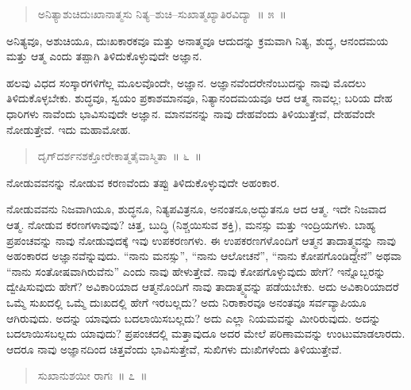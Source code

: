 \vspace{-0.3cm}

\begin{verse}
ಅನಿತ್ಯಾಶುಚಿದುಃಖಾನಾತ್ಮಸು ನಿತ್ಯ–ಶುಚಿ–ಸುಖಾತ್ಮಖ್ಯಾತಿರವಿದ್ಯಾ~॥ ೫~॥
\end{verse}

\vspace{-0.3cm}

ಅನಿತ್ಯವೂ, ಅಶುಚಿಯೂ, ದುಃಖಕಾರಕವೂ ಮತ್ತು ಅನಾತ್ಮವೂ ಆದುದನ್ನು ಕ್ರಮವಾಗಿ ನಿತ್ಯ, ಶುದ್ಧ, ಆನಂದಮಯ ಮತ್ತು ಆತ್ಮ ಎಂದು ತಪ್ಪಾಗಿ ತಿಳಿದುಕೊಳ್ಳುವುದೇ ಅಜ್ಞಾನ. 

ಹಲವು ವಿಧದ ಸಂಸ್ಕಾರಗಳಿಗೆಲ್ಲ ಮೂಲವೊಂದೇ, ಅಜ್ಞಾನ. ಅಜ್ಞಾನವೆಂದರೇನೆಂಬು\break ದನ್ನು ನಾವು ಮೊದಲು ತಿಳಿದುಕೊಳ್ಳಬೇಕು. ಶುದ್ಧವೂ, ಸ್ವಯಂ ಪ್ರಕಾಶಮಾನವೂ, ನಿತ್ಯಾನಂದಮಯವೂ ಆದ ಆತ್ಮ ನಾವಲ್ಲ; ಬರಿಯ ದೇಹ ಧಾರಿಗಳು ನಾವೆಂದು ಭಾವಿಸುವುದೇ ಅಜ್ಞಾನ. ಮಾನವನನ್ನು ನಾವು ದೇಹವೆಂದು ತಿಳಿಯುತ್ತೇವೆ, ದೇಹವೆಂದೇ ನೋಡುತ್ತೇವೆ. ಇದು ಮಹಾಮೋಹ. 

\vspace{-0.3cm}

\begin{verse}
ದೃಗ್​ದರ್ಶನಶಕ್ತೋರೇಕಾತ್ಮತೈವಾಸ್ಮಿತಾ~॥ ೬~॥
\end{verse}

\vspace{-0.3cm}

ನೋಡುವವನನ್ನು ನೋಡುವ ಕರಣವೆಂದು ತಪ್ಪು ತಿಳಿದುಕೊಳ್ಳುವುದೇ ಅಹಂಕಾರ. 

ನೋಡುವವನು ನಿಜವಾಗಿಯೂ, ಶುದ್ಧನೂ, ನಿತ್ಯಪವಿತ್ರನೂ, ಅನಂತನೂ,\break ಅದ್ಭುತನೂ ಆದ ಆತ್ಮ. ಇದೇ ನಿಜವಾದ ಆತ್ಮ. ನೋಡುವ ಕರಣಗಳಾವುವು? ಚಿತ್ತ, ಬುದ್ಧಿ (ನಿಶ್ಚಯಿಸುವ ಶಕ್ತಿ), ಮನಸ್ಸು ಮತ್ತು ಇಂದ್ರಿಯಗಳು. ಬಾಹ್ಯ ಪ್ರಪಂಚವನ್ನು ನಾವು ನೋಡುವುದಕ್ಕೆ ಇವು ಉಪಕರಣಗಳು. ಈ ಉಪಕರಣಗಳೊಂದಿಗೆ ಆತ್ಮನ ತಾದಾತ್ಮ್ಯವನ್ನು ನಾವು ಅಹಂಕಾರದ ಅಜ್ಞಾನವೆನ್ನುವುದು. “ನಾನು ಮನಸ್ಸು”, “ನಾನು ಆಲೋಚನೆ”, “ನಾನು ಕೋಪಗೊಂಡಿದ್ದೇನೆ” ಅಥವಾ “ನಾನು ಸಂತೋಷವಾಗಿರುವೆನು” ಎಂದು ನಾವು ಹೇಳುತ್ತೇವೆ. ನಾವು ಕೋಪಗೊಳ್ಳುವುದು ಹೇಗೆ? ಇನ್ನೊಬ್ಬರನ್ನು ದ್ವೇಷಿಸುವುದು ಹೇಗೆ? ಅವಿಕಾರಿಯಾದ ಆತ್ಮನೊಂದಿಗೆ ನಾವು ತಾದಾತ್ಮ್ಯವನ್ನು ಪಡೆಯಬೇಕು. ಅದು ಅವಿಕಾರಿಯಾದರೆ ಒಮ್ಮೆ ಸುಖದಲ್ಲಿ ಒಮ್ಮೆ ದುಃಖದಲ್ಲಿ ಹೇಗೆ ಇರಬಲ್ಲದು? ಅದು ನಿರಾಕಾರವೂ ಅನಂತವೂ ಸರ್ವವ್ಯಾಪಿಯೂ ಆಗಿರುವುದು. ಅದನ್ನು ಯಾವುದು ಬದಲಾಯಿಸಬಲ್ಲದು? ಅದು ಎಲ್ಲಾ ನಿಯಮವನ್ನು ಮೀರಿರುವುದು. ಅದನ್ನು ಬದಲಾಯಿಸಬಲ್ಲದು ಯಾವುದು? ಪ್ರಪಂಚದಲ್ಲಿ ಮತ್ತಾವುದೂ ಅದರ ಮೇಲೆ ಪರಿಣಾಮವನ್ನು ಉಂಟುಮಾಡಲಾರದು. ಆದರೂ ನಾವು ಅಜ್ಞಾನದಿಂದ ಚಿತ್ತವೆಂದು ಭಾವಿಸುತ್ತೇವೆ, ಸುಖಿಗಳು ದುಃಖಿಗಳೆಂದು ತಿಳಿಯುತ್ತೇವೆ. 

\vspace{-0.3cm}

\begin{verse}
ಸುಖಾನುಶಯೀ ರಾಗಃ~॥ ೭~॥
\end{verse}

\vspace{-0.3cm}

